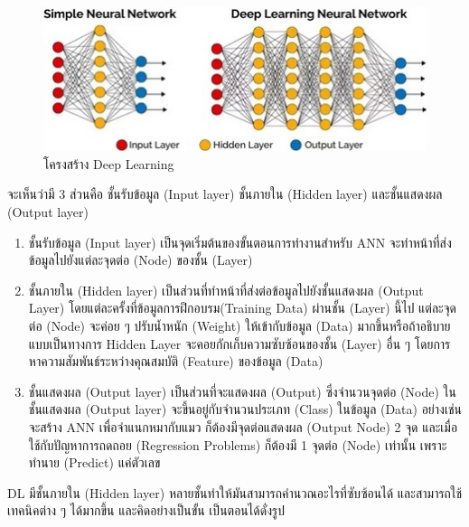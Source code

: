 \begin{figure}[!ht]
  \begin{center}
    \includegraphics[scale=0.8]{pic/deep1.jpg}
    \caption[โครงสร้าง Deep Learning]{โครงสร้าง Deep Learning}
    \label{fig:deep1}
  \end{center}
\end{figure}

จะเห็นว่ามี 3 ส่วนคือ ชั้นรับข้อมูล (Input layer) ชั้นภายใน (Hidden layer) และชั้นแสดงผล (Output layer)
\begin{enumerate}
  \item ชั้นรับข้อมูล (Input layer) เป็นจุดเริ่มต้นของขั้นตอนการทำงานสำหรับ ANN จะทำหน้าที่ส่งข้อมูลไปยังแต่ละจุดต่อ (Node) ของชั้น (Layer)
  \item ชั้นภายใน (Hidden layer) เป็นส่วนที่ทำหน้าที่ส่งต่อข้อมูลไปยังชั้นแสดงผล (Output Layer) โดยแต่ละครั้งที่ข้อมูลการฝึกอบรม(Training Data) 
  ผ่านชั้น (Layer) นี้ไป แต่ละจุดต่อ (Node) จะค่อย ๆ ปรับน้ำหนัก (Weight) ให้เข้ากับข้อมูล (Data) มากขึ้นหรือถ้าอธิบายแบบเป็นทางการ 
  Hidden Layer จะคอยกักเก็บความซับซ้อนของชั้น (Layer) อื่น ๆ โดยการหาความสัมพันธ์ระหว่างคุณสมบัติ (Feature) ของข้อมูล (Data)
  \item ชั้นแสดงผล (Output layer) เป็นส่วนที่จะแสดงผล (Output) ซึ่งจำนวนจุดต่อ (Node) ในชั้นแสดงผล (Output layer) จะขึ้นอยู่กับจำนวนประเภท (Class) 
  ในข้อมูล (Data) อย่างเช่นจะสร้าง ANN เพื่อจำแนกหมากับแมว ก็ต้องมีจุดต่อแสดงผล (Output Node) 2 จุด และเมื่อใช้กับปัญหาการถดถอย (Regression Problems) ก็ต้องมี 1 จุดต่อ (Node) เท่านั้น 
  เพราะทำนาย (Predict) แค่ตัวเลข
\end{enumerate}
DL มีชั้นภายใน (Hidden layer) หลายชั้นทำให้มันสามารถคำนวณอะไรที่ซับซ้อนได้ และสามารถใช้เทคนิคต่าง ๆ ได้มากขึ้น และคิดอย่างเป็นขั้น เป็นตอนได้ดั่งรูป \\

